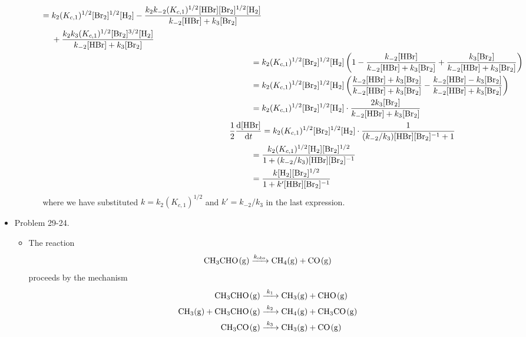 \documentclass[../notes.tex]{subfiles}
\begin{document}
\begin{itemize}
\begin{itemize}
\begin{itemize}
\begin{align*}
\begin{split}
                    ={}& k_2(K_{c,1})^{1/2}[\ce{Br2}]^{1/2}[\ce{H2}]-\frac{k_2k_{-2}(K_{c,1})^{1/2}[\ce{HBr}][\ce{Br2}]^{1/2}[\ce{H2}]}{k_{-2}[\ce{HBr}]+k_3[\ce{Br2}]}\\
                    &+\frac{k_2k_3(K_{c,1})^{1/2}[\ce{Br2}]^{3/2}[\ce{H2}]}{k_{-2}[\ce{HBr}]+k_3[\ce{Br2}]}
                \end{split}\\
                ={}& k_2(K_{c,1})^{1/2}[\ce{Br2}]^{1/2}[\ce{H2}]\left( 1-\frac{k_{-2}[\ce{HBr}]}{k_{-2}[\ce{HBr}]+k_3[\ce{Br2}]}+\frac{k_3[\ce{Br2}]}{k_{-2}[\ce{HBr}]+k_3[\ce{Br2}]} \right)\\
                ={}& k_2(K_{c,1})^{1/2}[\ce{Br2}]^{1/2}[\ce{H2}]\left( \frac{k_{-2}[\ce{HBr}]+k_3[\ce{Br2}]}{k_{-2}[\ce{HBr}]+k_3[\ce{Br2}]}-\frac{k_{-2}[\ce{HBr}]-k_3[\ce{Br2}]}{k_{-2}[\ce{HBr}]+k_3[\ce{Br2}]} \right)\\
                ={}& k_2(K_{c,1})^{1/2}[\ce{Br2}]^{1/2}[\ce{H2}]\cdot\frac{2k_3[\ce{Br2}]}{k_{-2}[\ce{HBr}]+k_3[\ce{Br2}]}\\
                \frac{1}{2}\dv{[\ce{HBr}]}{t} &= k_2(K_{c,1})^{1/2}[\ce{Br2}]^{1/2}[\ce{H2}]\cdot\frac{1}{(k_{-2}/k_3)[\ce{HBr}][\ce{Br2}]^{-1}+1}\\
                ={}& \frac{k_2(K_{c,1})^{1/2}[\ce{H2}][\ce{Br2}]^{1/2}}{1+(k_{-2}/k_3)[\ce{HBr}][\ce{Br2}]^{-1}}\\
                ={}& \frac{k[\ce{H2}][\ce{Br2}]^{1/2}}{1+k'[\ce{HBr}][\ce{Br2}]^{-1}}
            \end{align*}
            where we have substituted $k=k_2(K_{c,1})^{1/2}$ and $k'=k_{-2}/k_3$ in the last expression.
        \end{itemize}
    \end{itemize}
    \item Problem 29-24.
    \begin{itemize}
        \item The reaction
        \begin{equation*}
            \ce{CH3CHO(g) ->[$k_\text{obs}$] CH4(g) + CO(g)}
        \end{equation*}
        proceeds by the mechanism
        \begin{align*}
            \ce{CH3CHO(g)} &\ce{->[$k_1$]} \ce{CH3(g) + CHO(g)}\\
            \ce{CH3(g) + CH3CHO(g)} &\ce{->[$k_2$]} \ce{CH4(g) + CH3CO(g)}\\
            \ce{CH3CO(g)} &\ce{->[$k_3$]} \ce{CH3(g) + CO(g)}\\

\end{align*}
\end{itemize}
\end{itemize}
\end{document}
